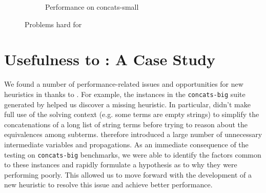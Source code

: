 \begin{figure}[h]
\begin{subfigure}{.5\textwidth}
            \label{fig:concats-small}
            \vspace{-0.25in}
            \caption{Performance on concats-small}
        \end{subfigure}
        \vspace{-0.1in}
        \caption{Problems hard for \us{}}
        \label{fig:z3str3-hard}
        \vspace{-0.3in}
    \end{figure}


\section{Usefulness to \us{}: A Case Study}
\label{sec:analysis}

We found a number of performance-related issues and opportunities for
new heuristics in \us{} thanks to \fuzzer{}. For example, the
instances in the \texttt{concats-big} suite generated by \fuzzer{}
helped us discover a missing heuristic. In particular, \us{} didn't
make full use of the solving context (e.g. some terms are empty
strings) to simplify the concatenations of a long list of string terms
before trying to reason about the equivalences among subterms. \us{}
therefore introduced a large number of unnecessary intermediate
variables and propagations. As an immediate consequence of the
testing \us{} on \texttt{concats-big} benchmarks, we were able to
identify the factors common to these instances and rapidly formulate a
hypothesis as to why they were performing poorly. This allowed us to
move forward with the development of a new heuristic to resolve this
issue and achieve better performance.




